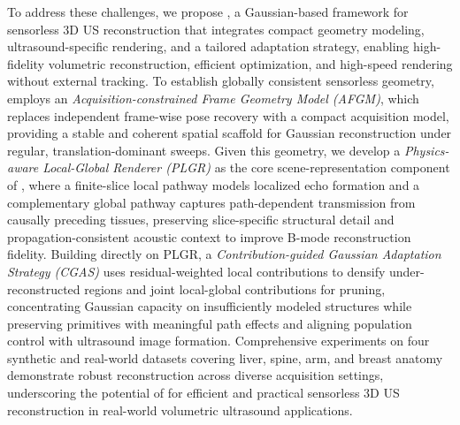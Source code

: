 To address these challenges, we propose \methodname{}, a Gaussian-based
framework for sensorless 3D US reconstruction that integrates compact geometry
modeling, ultrasound-specific rendering, and a tailored adaptation strategy,
enabling high-fidelity volumetric reconstruction, efficient optimization, and
high-speed rendering without external tracking.
To establish globally consistent sensorless geometry, \methodname{} employs an
\emph{Acquisition-constrained Frame Geometry Model (AFGM)}, which replaces
independent frame-wise pose recovery with a compact acquisition model, providing
a stable and coherent spatial scaffold for Gaussian reconstruction under
regular, translation-dominant sweeps.
Given this geometry, we develop a \emph{Physics-aware Local-Global Renderer
(PLGR)} as the core scene-representation component of \methodname{}, where a
finite-slice local pathway models localized echo formation and a complementary
global pathway captures path-dependent transmission from causally preceding
tissues, preserving slice-specific structural detail and propagation-consistent
acoustic context to improve B-mode reconstruction fidelity.
Building directly on PLGR, a \emph{Contribution-guided Gaussian Adaptation
Strategy (CGAS)} uses residual-weighted local contributions to densify
under-reconstructed regions and joint local-global contributions for pruning,
concentrating Gaussian capacity on insufficiently modeled structures while
preserving primitives with meaningful path effects and aligning population
control with ultrasound image formation.
Comprehensive experiments on four synthetic and real-world datasets covering
liver, spine, arm, and breast anatomy demonstrate robust reconstruction across
diverse acquisition settings, underscoring the potential of \methodname{} for
efficient and practical sensorless 3D US reconstruction in real-world
volumetric ultrasound applications.
